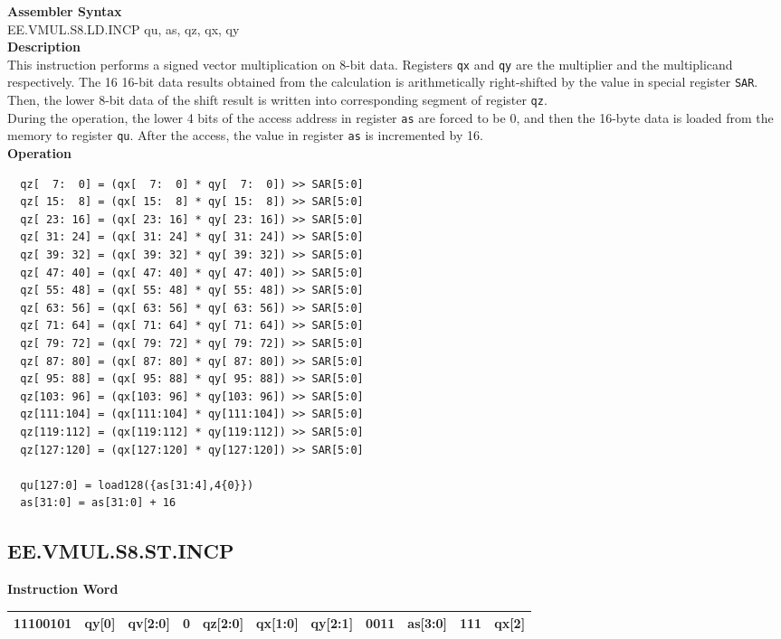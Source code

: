 \textbf{Assembler Syntax} \\
EE.VMUL.S8.LD.INCP qu, as, qz, qx, qy \\
\textbf{Description} \\
This instruction performs a signed vector multiplication on 8-bit data. Registers \lstinline{qx} and \lstinline{qy} are the multiplier and the multiplicand respectively. The 16 16-bit data results obtained from the calculation is arithmetically right-shifted by the value in special register \lstinline{SAR}. Then, the lower 8-bit data of the shift result is written into corresponding segment of register \lstinline{qz}. \\ During the operation, the lower 4 bits of the access address in register \lstinline{as} are forced to be 0, and then the 16-byte data is loaded from the memory to register \lstinline{qu}. After the access, the value in register \lstinline{as} is incremented by 16.\\
\textbf{Operation}
\begin{lstlisting}
  qz[  7:  0] = (qx[  7:  0] * qy[  7:  0]) >> SAR[5:0]
  qz[ 15:  8] = (qx[ 15:  8] * qy[ 15:  8]) >> SAR[5:0]
  qz[ 23: 16] = (qx[ 23: 16] * qy[ 23: 16]) >> SAR[5:0]
  qz[ 31: 24] = (qx[ 31: 24] * qy[ 31: 24]) >> SAR[5:0]
  qz[ 39: 32] = (qx[ 39: 32] * qy[ 39: 32]) >> SAR[5:0]
  qz[ 47: 40] = (qx[ 47: 40] * qy[ 47: 40]) >> SAR[5:0]
  qz[ 55: 48] = (qx[ 55: 48] * qy[ 55: 48]) >> SAR[5:0]
  qz[ 63: 56] = (qx[ 63: 56] * qy[ 63: 56]) >> SAR[5:0]
  qz[ 71: 64] = (qx[ 71: 64] * qy[ 71: 64]) >> SAR[5:0]
  qz[ 79: 72] = (qx[ 79: 72] * qy[ 79: 72]) >> SAR[5:0]
  qz[ 87: 80] = (qx[ 87: 80] * qy[ 87: 80]) >> SAR[5:0]
  qz[ 95: 88] = (qx[ 95: 88] * qy[ 95: 88]) >> SAR[5:0]
  qz[103: 96] = (qx[103: 96] * qy[103: 96]) >> SAR[5:0]
  qz[111:104] = (qx[111:104] * qy[111:104]) >> SAR[5:0]
  qz[119:112] = (qx[119:112] * qy[119:112]) >> SAR[5:0]
  qz[127:120] = (qx[127:120] * qy[127:120]) >> SAR[5:0]

  qu[127:0] = load128({as[31:4],4{0}})
  as[31:0] = as[31:0] + 16
\end{lstlisting}

\clearpage
\subsection{EE.VMUL.S8.ST.INCP}\label{instruction:EEVMULS8STINCP}
\setlength\tabcolsep{6pt}
\textbf{Instruction Word} \\
\begin{tabular}{|c|c|c|c|c|c|c|c|c|c|c|}
	\hline
	11100101 & qy[0] & qv[2:0] & 0 & qz[2:0] & qx[1:0] & qy[2:1] & 0011 & as[3:0] & 111 & qx[2] \\
	\hline
\end{tabular}

